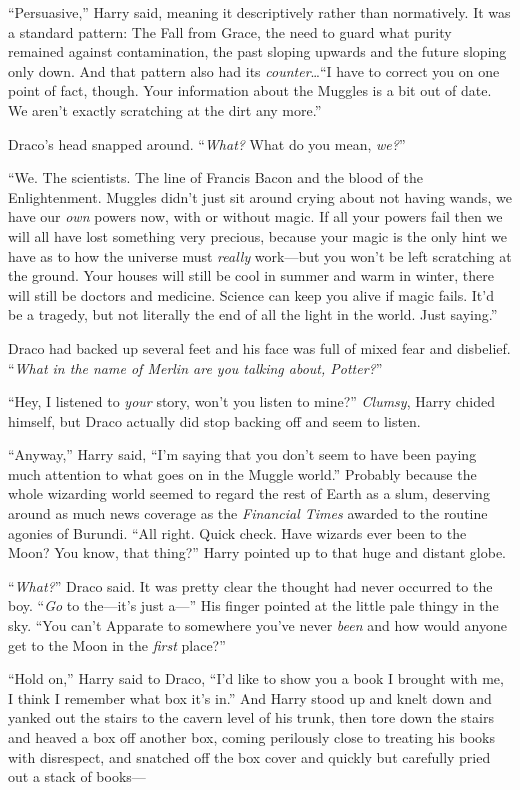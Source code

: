 “Persuasive,” Harry said, meaning it descriptively rather than normatively. It was a standard pattern: The Fall from Grace, the need to guard what purity remained against contamination, the past sloping upwards and the future sloping only down. And that pattern also had its \emph{counter}…“I have to correct you on one point of fact, though. Your information about the Muggles is a bit out of date. We aren’t exactly scratching at the dirt any more.”

Draco’s head snapped around. “\emph{What?} What do you mean, \emph{we?}”

“We. The scientists. The line of Francis Bacon and the blood of the Enlightenment. Muggles didn’t just sit around crying about not having wands, we have our \emph{own} powers now, with or without magic. If all your powers fail then we will all have lost something very precious, because your magic is the only hint we have as to how the universe must \emph{really} work—but you won’t be left scratching at the ground. Your houses will still be cool in summer and warm in winter, there will still be doctors and medicine. Science can keep you alive if magic fails. It’d be a tragedy, but not literally the end of all the light in the world. Just saying.”

Draco had backed up several feet and his face was full of mixed fear and disbelief. “\emph{What in the name of Merlin are you talking about, Potter?}”

“Hey, I listened to \emph{your} story, won’t you listen to mine?” \emph{Clumsy}, Harry chided himself, but Draco actually did stop backing off and seem to listen.

“Anyway,” Harry said, “I’m saying that you don’t seem to have been paying much attention to what goes on in the Muggle world.” Probably because the whole wizarding world seemed to regard the rest of Earth as a slum, deserving around as much news coverage as the \emph{Financial Times} awarded to the routine agonies of Burundi. “All right. Quick check. Have wizards ever been to the Moon? You know, that thing?” Harry pointed up to that huge and distant globe.

“\emph{What?}” Draco said. It was pretty clear the thought had never occurred to the boy. “\emph{Go} to the—it’s just a—” His finger pointed at the little pale thingy in the sky. “You can’t Apparate to somewhere you’ve never \emph{been} and how would anyone get to the Moon in the \emph{first} place?”

“Hold on,” Harry said to Draco, “I’d like to show you a book I brought with me, I think I remember what box it’s in.” And Harry stood up and knelt down and yanked out the stairs to the cavern level of his trunk, then tore down the stairs and heaved a box off another box, coming perilously close to treating his books with disrespect, and snatched off the box cover and quickly but carefully pried out a stack of books—

